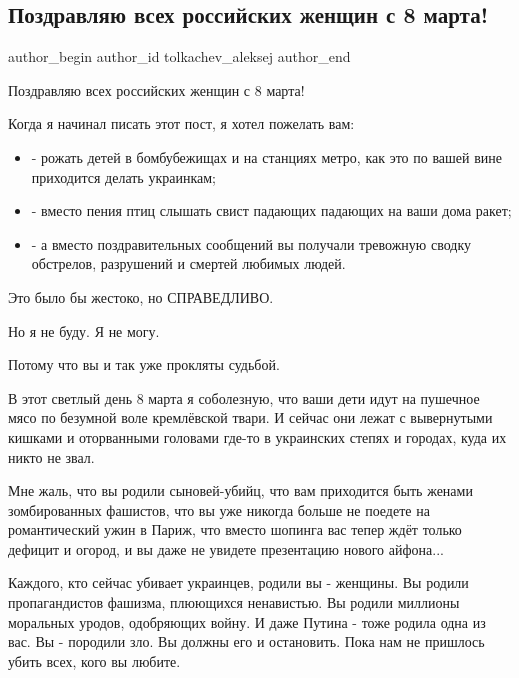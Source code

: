 
 
 
 
 
 
\subsection{Поздравляю всех российских женщин с 8 марта!}
\label{sec:08_03_2022.fb.tolkachev_aleksej.1.8_marta_rossia_zhenschiny}
 
\ifcmt
 author_begin
   author_id tolkachev_aleksej
 author_end
\fi

Поздравляю всех российских женщин с 8 марта!


Когда я начинал писать этот пост, я хотел пожелать вам:

\begin{itemize}
  \item - рожать детей в бомбубежищах и на станциях метро, как это по вашей вине приходится делать украинкам;
  \item - вместо пения птиц слышать свист падающих падающих на ваши дома ракет; 
  \item - а вместо поздравительных сообщений вы получали тревожную сводку обстрелов, разрушений и смертей любимых людей. 
\end{itemize}

Это было бы жестоко, но СПРАВЕДЛИВО. 

Но я не буду. Я не могу. 

Потому что вы и так уже прокляты судьбой.  

В этот светлый день 8 марта я соболезную, что ваши дети идут на пушечное мясо
по безумной воле кремлёвской твари. И сейчас они лежат с вывернутыми кишками и
оторванными головами где-то в украинских степях и городах, куда их никто не
звал. 

Мне жаль, что вы родили сыновей-убийц, что вам приходится быть женами
зомбированных фашистов, что вы уже никогда больше не поедете на романтический
ужин в Париж, что вместо шопинга вас тепер ждёт только дефицит и огород, и вы
даже не увидете презентацию нового айфона...

\obeycr
Каждого, кто сейчас убивает украинцев, родили вы - женщины. 
Вы родили пропагандистов фашизма, плюющихся ненавистью. 
Вы родили миллионы моральных уродов, одобряющих войну.
И даже Путина - тоже родила одна из вас. 
Вы - породили зло. 
Вы должны его и остановить.  
Пока нам не пришлось убить всех, кого вы любите.
\restorecr

